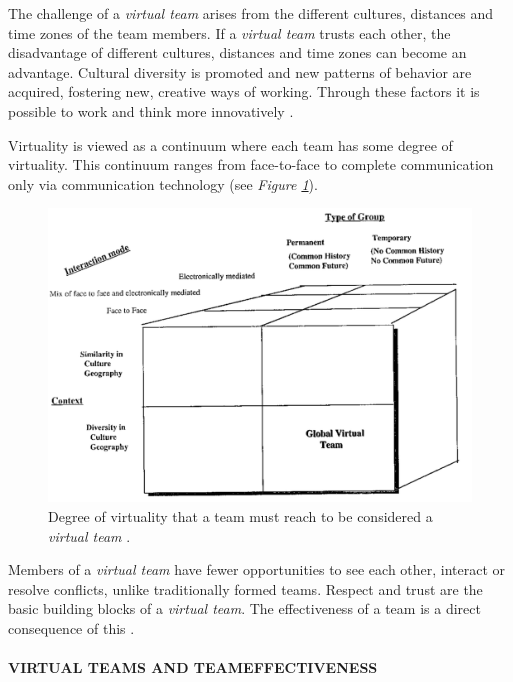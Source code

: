 \documentclass[sigchi]{acmart}
\begin{document}
The challenge of a \textit{virtual team} arises from the different cultures, distances and time zones of the team members. If a \textit{virtual team} trusts each other, the disadvantage of different cultures, distances and time zones can become an advantage. Cultural diversity is promoted and new patterns of behavior are acquired, fostering new, creative ways of working. Through these factors it is possible to work and think more innovatively \citep{dyer1995team} \citep[S. 405-416]{milliken1996searching}.

Virtuality is viewed as a continuum where each team has some degree of virtuality. This continuum ranges from face-to-face to complete communication only via communication technology \citep{martins2004virtual} (see \textit{Figure \ref{virtualTeamsVirtuality}}).

\begin{figure}[h]
  \centering
 	\includegraphics[width=\linewidth]{Abbildungen/GlobalVirtualTeam.PNG}	
			\caption[Virtuality of a virtual team]{Degree of virtuality that a team must reach to be considered a \textit{virtual team} \citep{jarvenpaa1999communication}.}
			\label{virtualTeamsVirtuality}
\end{figure}

Members of a \textit{virtual team} have fewer opportunities to see each other, interact or resolve conflicts, unlike traditionally formed teams. Respect and trust are the basic building blocks of a \textit{virtual team}. The effectiveness of a team is a direct consequence of this \citep[p. 378]{ren2007applying}.

\paragraph{VIRTUAL TEAMS AND TEAMEFFECTIVENESS}
\end{document}
